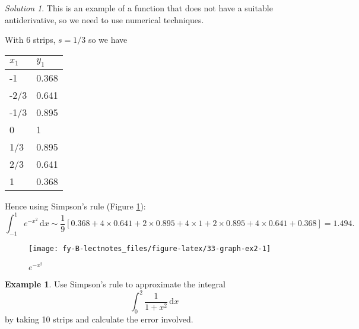 \documentclass[
  11pt,
  oneside]{book}
\newcommand{\slide}{}
\theoremstyle{definition}
\theoremstyle{definition}
\newtheorem{example}{Example}[chapter]
\theoremstyle{definition}
\theoremstyle{definition}
\theoremstyle{remark}
\newtheorem*{solution}{Solution}
\begin{document}
\begin{solution}

This is an example of a function that does not have a suitable antiderivative, so we need to use numerical techniques.

With 6 strips, \(s=1/3\) so we have

\begin{tabular}{l|l}
\hline
$x_1$ & $y_1$\\
\hline
-1 & 0.368\\
\hline
-2/3 & 0.641\\
\hline
-1/3 & 0.895\\
\hline
0 & 1\\
\hline
1/3 & 0.895\\
\hline
2/3 & 0.641\\
\hline
1 & 0.368\\
\hline
\end{tabular}

Hence using Simpson's rule (Figure \ref{fig:33-graph-ex2}):
\[
\int_{-1}^1e^{-x^2}\,\mathrm{d}x \sim \frac19\left[0.368 + 4\times0.641+2\times0.895+4\times1+2\times0.895+4\times0.641+0.368\right] = 1.494.
\]

\begin{figure}

{\centering \texttt{[image: fy-B-lectnotes\_files/figure-latex/33-graph-ex2-1]} 

}

\caption{$e^{-x^2}$}\label{fig:33-graph-ex2}
\end{figure}

\end{solution}

\slide

\begin{slidesonly}

\hbox{}
\slide
\hbox{}
\slide

\end{slidesonly}

\begin{example}
Use Simpson's rule to approximate the integral
\[
\int_0^2\frac1{1+x^2}\,\mathrm{d}x
\]
by taking 10 strips and calculate the error involved.
\end{example}
\end{document}

